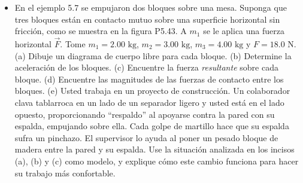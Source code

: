 \documentclass[11pt,a4paper]{article}
\begin{document}
\begin{itemize}
    \item[\textbf{43.}] En el ejemplo 5.7 se empujaron dos bloques sobre una mesa. Suponga que tres bloques están en contacto mutuo sobre una superficie horizontal sin fricción, como se muestra en la figura P5.43. A $m_1$ se le aplica una fuerza horizontal $\vec{F}$. Tome $m_1 = 2.00 \text{ kg}$, $m_2 = 3.00 \text{ kg}$, $m_3 = 4.00 \text{ kg}$ y $F = 18.0 \text{ N}$. (a) Dibuje un diagrama de cuerpo libre para cada bloque. (b) Determine la aceleración de los bloques. (c) Encuentre la fuerza \textit{resultante} sobre cada bloque. (d) Encuentre las magnitudes de las fuerzas de contacto entre los bloques. (e) Usted trabaja en un proyecto de construcción. Un colaborador clava tablarroca en un lado de un separador ligero y usted está en el lado opuesto, proporcionando ``respaldo'' al apoyarse contra la pared con su espalda, empujando sobre ella. Cada golpe de martillo hace que su espalda sufra un pinchazo. El supervisor lo ayuda al poner un pesado bloque de madera entre la pared y su espalda. Use la situación analizada en los incisos (a), (b) y (c) como modelo, y explique cómo este cambio funciona para hacer su trabajo más confortable.
    \vspace*{9cm}
\end{itemize}

\newpage
\end{document}
